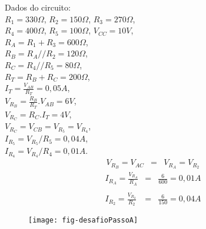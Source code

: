 \begin{minipage}{\linewidth}
  \centering
  \begin{minipage}{0.45\linewidth}
    Dados do circuito: \\
                $R_1 = 330\Omega$,
                $R_2 = 150\Omega$,
                $R_3 = 270\Omega$, \\
                $R_4 = 400\Omega$,
                $R_5 = 100\Omega$,
                $V_{CC} = 10V$, \\
                $R_A = R_1 + R_3 = 600\Omega$, \\
                $R_B = R_A // R_2 = 120\Omega$, \\
                $R_C = R_4 // R_5 = 80\Omega$, \\
                $R_T = R_B + R_C = 200\Omega$, \\
                \color{blue}
                $I_T = \frac{V_{AB}}{R_T} = 0,05 A$,\\
                \color{red}
                $V_{R_B} = \frac{R_B}{R_T} . V_{AB} = 6V$,\\
                $V_{R_C} = R_C.I_T = 4V$, \\
                $V_{R_C} = V_{CB} = V_{R_5} = V_{R_4}$,\\
                \color{blue}
                $I_{R_5} = V_{R_5} / R_5 = 0,04 A $, \\
                $I_{R_4} = V_{R_4} / R_4 = 0,01 A$.
    \color{red}
    \begin{eqnarray}
      V_{R_B} = V_{AC} & = & V_{R_A} = V_{R_2} \nonumber
    \end{eqnarray}
    \color{blue}
    \vspace{-10mm}
    \begin{eqnarray}
      I_{R_A} = \frac{V_{R_A}}{R_A} & = & \frac{6}{600} = 0,01 A \nonumber\\
      \nonumber\\
      I_{R_2} = \frac{V_{R_2}}{R_2} & = & \frac{6}{150} = 0,04 A \nonumber
    \end{eqnarray}
  \end{minipage}
  \hspace{0.05\linewidth}
  \begin{minipage}{0.45\linewidth}
    \begin{figure}[H]
      \centering
      \texttt{[image: fig-desafioPassoA]}
    \end{figure}
  \end{minipage}
\end{minipage}








